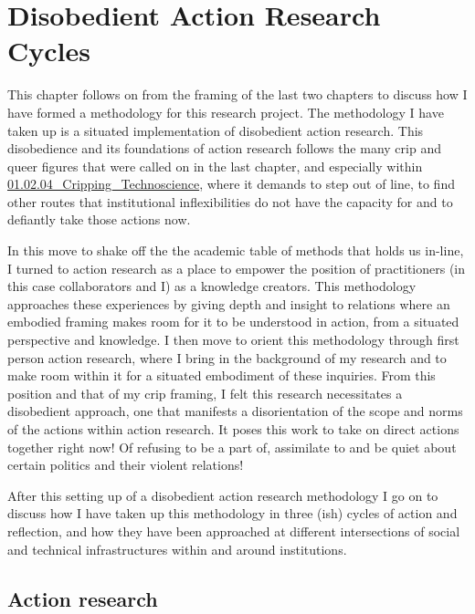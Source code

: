 \hypertarget{disobedient-action-research-cycles}{%
\section{Disobedient Action Research
Cycles}\label{disobedient-action-research-cycles}}

This chapter follows on from the framing of the last two chapters to
discuss how I have formed a methodology for this research project. The
methodology I have taken up is a situated implementation of disobedient
action research. This disobedience and its foundations of action
research follows the many crip and queer figures that were called on in
the last chapter, and especially within
\href{../../01_Disability_justice_and_life_affirmation_flipping_the_table/sections/01.02.04_Cripping_Technoscience.md}{01.02.04\_Cripping\_Technoscience},
where it demands to step out of line, to find other routes that
institutional inflexibilities do not have the capacity for and to
defiantly take those actions now.

In this move to shake off the the academic table of methods that holds
us in-line, I turned to action research as a place to empower the
position of practitioners (in this case collaborators and I) as a
knowledge creators. This methodology approaches these experiences by
giving depth and insight to relations where an embodied framing makes
room for it to be understood in action, from a situated perspective and
knowledge. I then move to orient this methodology through first person
action research, where I bring in the background of my research and to
make room within it for a situated embodiment of these inquiries. From
this position and that of my crip framing, I felt this research
necessitates a disobedient approach, one that manifests a disorientation
of the scope and norms of the actions within action research. It poses
this work to take on direct actions together right now! Of refusing to
be a part of, assimilate to and be quiet about certain politics and
their violent relations!

After this setting up of a disobedient action research methodology I go
on to discuss how I have taken up this methodology in three (ish) cycles
of action and reflection, and how they have been approached at different
intersections of social and technical infrastructures within and around
institutions.

\hypertarget{action-research}{%
\subsection{Action research}\label{action-research}}

